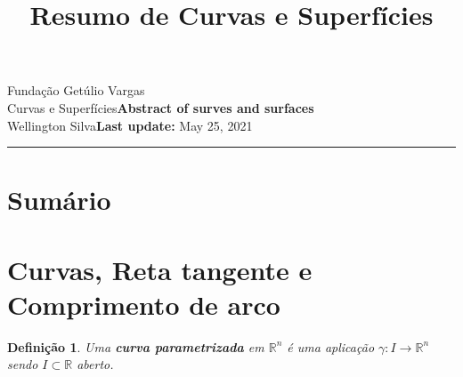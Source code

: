 \documentclass{article}
\title{Resumo de Curvas e Superfícies}
\author{}
\date{}
\newtheorem{definition}{Definição}
\newcommand{\assignment}{Abstract of surves and surfaces}
\newcommand{\duedate}{May 25, 2021}
\begin{document}
Fundação Getúlio Vargas\hfill\\
Curvas e Superfícies\hfill\textbf{\assignment}\\
Wellington Silva\hfill\textbf{Last update:} \duedate\\
\smallskip\hrule\bigskip

{\let\newpage\relax\maketitle}
\maketitle

\section*{Sumário}

\textbf{}
\vspace{4.0mm}

\textbf{}
\vspace{4.0mm}

\textbf{}
\vspace{4.0mm}

\textbf{}
\vspace{4.0mm}

\textbf{}
\vspace{4.0mm}

\textbf{}
\vspace{4.0mm}

\textbf{}
\vspace{4.0mm}

\textbf{}
\vspace{4.0mm}

\textbf{}
\vspace{4.0mm}

\textbf{}
\vspace{4.0mm}

\textbf{}
\vspace{4.0mm}

\newpage

\section*{Curvas, Reta tangente e Comprimento de arco}
\label{s1}

\begin{definition}
Uma \textbf{curva parametrizada} em $\mathbb{R}^n$ é uma aplicação $\gamma: I \rightarrow \mathbb{R}^n$ sendo $I \subset \mathbb{R}$ aberto.
\end{definition}
\end{document}
